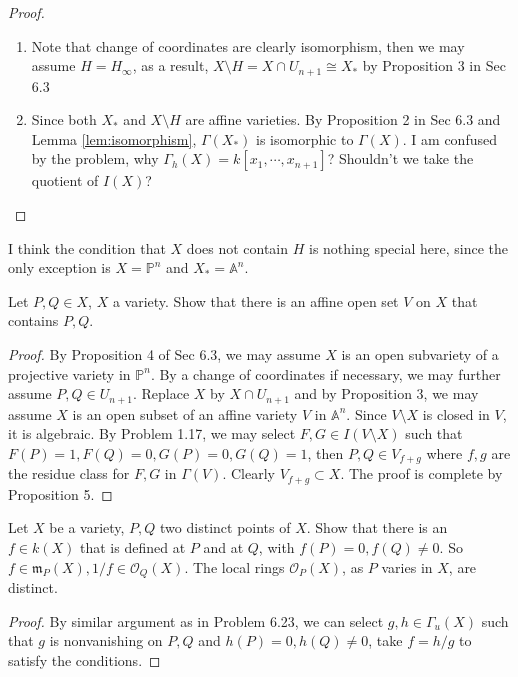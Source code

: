 \documentclass{solution}
\begin{document}
\begin{proof}
    \begin{enumerate}
        \item Note that change of coordinates are clearly isomorphism, then we may assume $H = H_{\infty}$, as a result, $X \setminus H = X \cap U_{n + 1} \cong X_*$ by Proposition 3 in Sec 6.3
        \item Since both $X_*$ and $X \setminus H$ are affine varieties. By Proposition 2 in Sec 6.3 and Lemma \ref{lem:isomorphism}, $\Gamma(X_*)$ is isomorphic to $\Gamma(X)$. {\color{red}I am confused by the problem, why $\Gamma_h(X) = k[x_1, \cdots, x_{n + 1}]$? Shouldn't we take the quotient of $I(X)$?}
    \end{enumerate}
\end{proof}

I think the condition that $X$ does not contain $H$ is nothing special here, since the only exception is $X = \mathbb{P}^n$ and $X_* = \mathbb{A}^n$.

\begin{problem}{6.23}
    Let $P, Q \in X$, $X$ a variety. Show that there is an affine open set $V$ on $X$ that contains $P, Q$. 
\end{problem}

\begin{proof}
    By Proposition 4 of Sec 6.3, we may assume $X$ is an open subvariety of a projective variety in $\mathbb{P}^n$. By a change of coordinates if necessary, we may further assume $P, Q \in U_{n + 1}$. Replace $X$ by $X \cap U_{n + 1}$ and by Proposition 3, we may assume $X$ is an open subset of an affine variety $V$ in $\mathbb{A}^n$. Since $V \setminus X$ is closed in $V$, it is algebraic. By Problem 1.17, we may select $F, G \in I(V \setminus X)$ such that $F(P) = 1, F(Q) = 0, G(P) = 0, G(Q) = 1$, then $P, Q \in V_{f + g}$ where $f, g$ are the residue class for $F, G$ in $\Gamma(V)$. Clearly $V_{f + g} \subset X$. The proof is complete by Proposition 5.
\end{proof}

\begin{problem}{6.24}
    Let $X$ be a variety, $P, Q$ two distinct points of $X$. Show that there is an $f \in k(X)$ that is defined at $P$ and at $Q$, with $f(P) = 0, f(Q) \ne 0$. So $f \in \mathfrak{m}_P(X), 1 / f \in \mathcal{O}_{Q}(X)$. The local rings $\mathcal{O}_{P}(X)$, as $P$ varies in $X$, are distinct.
\end{problem}

\begin{proof}
    By similar argument as in Problem 6.23, we can select $g, h \in \Gamma_u(X)$ such that $g$ is nonvanishing on $P, Q$ and $h(P) = 0, h(Q) \ne 0$, take $f = h / g$ to satisfy the conditions.
\end{proof}
\end{document}
